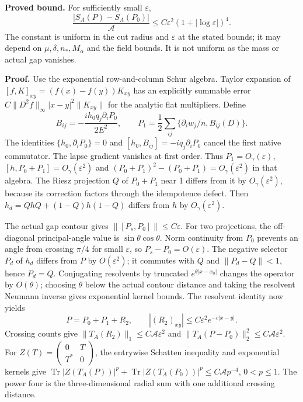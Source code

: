 \documentclass[10pt]{article}
\newcommand{\Tr}{\operatorname{Tr}}
\newcommand{\eps}{\varepsilon}
\begin{document}
\textbf{Proved bound.} For sufficiently small $\eps$,
\begin{equation}
 \boxed{\displaystyle
 \frac{|S_A(P)-S_A(P_0)|}{\mathcal A}
       \leq C\eps^2(1+|\log\eps|)^4 .}             \tag{1}
\end{equation}
The constant is uniform in the cut radius and $\eps$ at the stated
bounds; it may depend on $\mu,\delta,n_*,M_\alpha$ and the field bounds.
It is not uniform as the mass or actual gap vanishes.

\textbf{Proof.} Use the exponential row-and-column Schur algebra.
Taylor expansion of $[f,K]_{xy}=(f(x)-f(y))K_{xy}$ has an explicitly
summable error $C\|D^2f\|_\infty|x-y|^2\|K_{xy}\|$ for the analytic
flat multipliers. Define
\[
 B_{ij}=-\frac{i h_0q_j\partial_iP_0}{2E^2},\qquad
 P_1=\frac12\sum_{ij}\{\partial_iw_j/n,B_{ij}(D)\}.
\]
The identities $\{h_0,\partial_iP_0\}=0$ and
$[h_0,B_{ij}]=-iq_j\partial_iP_0$ cancel the first native commutator.
The lapse gradient vanishes at first order. Thus $P_1=O_\gamma(\eps)$,
$[h,P_0+P_1]=O_\gamma(\eps^2)$ and
$(P_0+P_1)^2-(P_0+P_1)=O_\gamma(\eps^2)$ in that algebra.
The Riesz projection $Q$ of $P_0+P_1$ near 1 differs from it by
$O_\gamma(\eps^2)$, because its correction factors through the
idempotence defect. Then
$h_d=QhQ+(1-Q)h(1-Q)$ differs from $h$ by $O_\gamma(\eps^2)$.

The actual gap contour gives $\|[P_s,P_0]\|\leq C\eps$.
For two projections, the off-diagonal principal-angle value is
$\sin\theta\cos\theta$. Norm continuity from $P_0$ prevents an angle
from crossing $\pi/4$ for small $\eps$, so $P_s-P_0=O(\eps)$.
The negative selector $P_d$ of $h_d$ differs from $P$ by $O(\eps^2)$;
it commutes with $Q$ and $\|P_d-Q\|<1$, hence $P_d=Q$.
Conjugating resolvents by truncated $e^{\theta|x-x_0|}$ changes the
operator by $O(\theta)$; choosing $\theta$ below the actual contour
distance and taking the resolvent Neumann inverse gives exponential
kernel bounds. The resolvent identity now yields
\[
 P=P_0+P_1+R_2,\qquad |(R_2)_{xy}|\leq C\eps^2e^{-c|x-y|}.
\]
Crossing counts give
$\|T_A(R_2)\|_1\leq C\mathcal A\eps^2$ and
$\|T_A(P-P_0)\|_2^2\leq C\mathcal A\eps^2$.
For $Z(T)=\left(\begin{smallmatrix}0&T\\T^*&0\end{smallmatrix}\right)$,
the entrywise Schatten inequality and exponential kernels give
$\Tr|Z(T_A(P))|^p+\Tr|Z(T_A(P_0))|^p\leq C\mathcal A p^{-4}$,
$0<p\leq1$. The power four is the three-dimensional radial sum
with one additional crossing distance.
\end{document}
